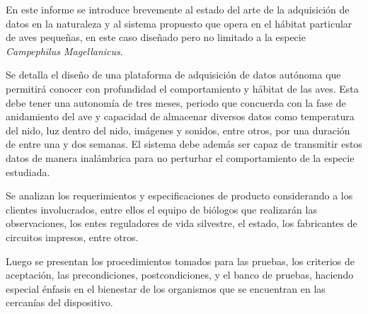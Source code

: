 %

%

En este informe se introduce brevemente al estado del arte de la adquisición de datos en la naturaleza y al sistema propuesto que opera en el hábitat particular de aves pequeñas, en este caso diseñado pero no limitado a la especie \textit{Campephilus Magellanicus}. 

Se detalla el diseño de una plataforma de adquisición de datos autónoma que permitirá conocer con profundidad el comportamiento y hábitat de las aves. Esta debe tener una autonomía de tres meses, periodo que concuerda con la fase de anidamiento del ave y capacidad de almacenar diversos datos como temperatura del nido, luz dentro del nido, imágenes y sonidos, entre otros, por una duración de entre una y dos semanas. El sistema debe además ser capaz de transmitir estos datos de manera inalámbrica para no perturbar el comportamiento de la especie estudiada.

Se analizan los requerimientos y especificaciones de producto considerando a los clientes involucrados, entre ellos el equipo de biólogos que realizarán las observaciones, los entes reguladores de vida silvestre, el estado, los fabricantes de circuitos impresos, entre otros.

Luego se presentan los procedimientos tomados para las pruebas, los criterios de aceptación, las precondiciones, postcondiciones, y el banco de pruebas, haciendo especial énfasis en el bienestar de los organismos que se encuentran en las cercanías del dispositivo.

%